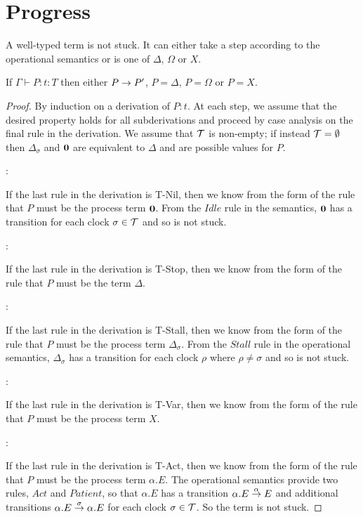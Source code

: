 \chapter{Progress}
\label{progress}

A well-typed term is not stuck.  It can either take a step according
to the operational semantics or is one of $\Delta$, $\Omega$ or $X$.

\begin{theorem}
If $\Gamma \vdash P : t : T$ then either $P \stackrel{}{\rightarrow} P'$, $P =
\Delta$, $P = \Omega$ or $P = X$.
\end{theorem}

\begin{proof}
By induction on a derivation of $P:t$.  At each step, we assume that
the desired property holds for all subderivations and proceed by case
analysis on the final rule in the derivation.  We assume that
$\text{$\mathcal{T}$}$ is non-empty; if instead $\text{$\mathcal{T}$} = \emptyset$ then
$\Delta_\sigma$ and $\textbf{0}$ are equivalent to $\Delta$ and are possible
values for $P$.

:

\noindent If the last rule in the derivation is T-Nil, then we know
from the form of the rule that $P$ must be the process term $\textbf{0}$.
From the $Idle$ rule in the semantics, $\textbf{0}$ has a transition for
each clock $\sigma \in \text{$\mathcal{T}$}$ and so is not stuck.

:

\noindent If the last rule in the derivation is T-Stop, then we know
from the form of the rule that $P$ must be the term $\Delta$.

:

\noindent If the last rule in the derivation is T-Stall, then we know
from the form of the rule that $P$ must be the process term
$\Delta_\sigma$.  From the $Stall$ rule in the operational semantics,
$\Delta_\sigma$ has a transition for each clock $\rho$ where $\rho \ne
\sigma$ and so is not stuck.

:

\noindent If the last rule in the derivation is T-Var, then we know
from the form of the rule that $P$ must be the process term $X$.

:

\noindent If the last rule in the derivation is T-Act, then we know
from the form of the rule that $P$ must be the process term
$\alpha.E$.  The operational semantics provide two rules, $Act$ and
$Patient$, so that $\alpha.E$ has a transition $\alpha.E
\stackrel{\alpha}{\rightarrow} E$ and additional transitions $\alpha.E
\stackrel{\sigma}{\rightarrow} \alpha.E$ for each clock $\sigma \in \text{$\mathcal{T}$}$.  So
the term is not stuck.


\end{proof}

